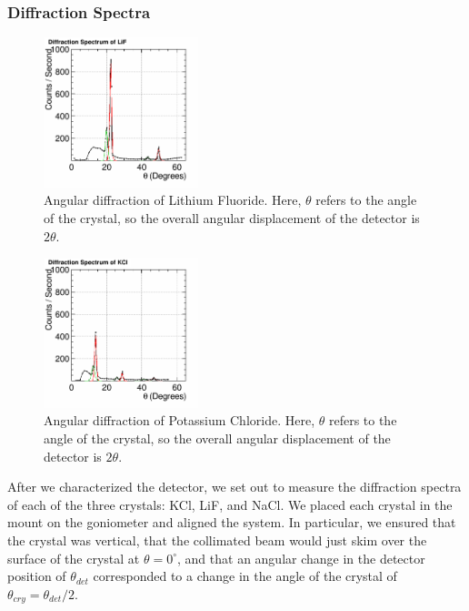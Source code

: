 \documentclass[%
 reprint,
 amsmath,amssymb,
 aps,
 pra,
]{revtex4-1}
\begin{document}
\subsubsection{Diffraction Spectra}

\begin{figure}[H]
	\centering
	\includegraphics[width=0.4\textwidth]{Diffraction_LiF.png}
	\caption{Angular diffraction of Lithium Fluoride. Here, $\theta$ refers to the angle of the crystal, so the overall angular displacement of the detector is $2 \theta$.}
	\label{fig:LiF}
\end{figure}

\begin{figure}[H]
	\centering
	\includegraphics[width=0.4\textwidth]{Diffraction_KCl.png}
	\caption{Angular diffraction of Potassium Chloride. Here, $\theta$ refers to the angle of the crystal, so the overall angular displacement of the detector is $2 \theta$.}
	\label{fig:KCl}
\end{figure}

After we characterized the detector, we set out to measure the diffraction spectra of each of the three crystals: KCl, LiF, and NaCl. We placed each crystal in the mount on the goniometer and aligned the system. In particular, we ensured that the crystal was vertical, that the collimated beam would just skim over the surface of the crystal at $\theta = 0^\circ$, and that an angular change in the detector position of $\theta_{det}$ corresponded to a change in the angle of the crystal of $\theta_{cry} = \theta_{det}/2$. 
\end{document}

